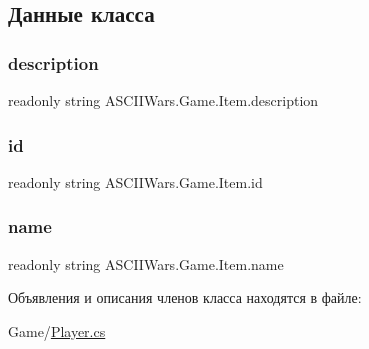\subsection{Данные класса}
\hypertarget{class_a_s_c_i_i_wars_1_1_game_1_1_item_a6ff41e953ccebc64a8df8f8c434535a0}{}\label{class_a_s_c_i_i_wars_1_1_game_1_1_item_a6ff41e953ccebc64a8df8f8c434535a0} 
\subsubsection{\texorpdfstring{description}{description}}
{\footnotesize\ttfamily readonly string A\+S\+C\+I\+I\+Wars.\+Game.\+Item.\+description}

\hypertarget{class_a_s_c_i_i_wars_1_1_game_1_1_item_a744d51f7684a4e46a1f834f8666db58e}{}\label{class_a_s_c_i_i_wars_1_1_game_1_1_item_a744d51f7684a4e46a1f834f8666db58e} 
\subsubsection{\texorpdfstring{id}{id}}
{\footnotesize\ttfamily readonly string A\+S\+C\+I\+I\+Wars.\+Game.\+Item.\+id}

\hypertarget{class_a_s_c_i_i_wars_1_1_game_1_1_item_a994b9ec5f10c123e4345da159c090091}{}\label{class_a_s_c_i_i_wars_1_1_game_1_1_item_a994b9ec5f10c123e4345da159c090091} 
\subsubsection{\texorpdfstring{name}{name}}
{\footnotesize\ttfamily readonly string A\+S\+C\+I\+I\+Wars.\+Game.\+Item.\+name}



Объявления и описания членов класса находятся в файле\+:\begin{DoxyCompactItemize}
\item 
Game/\hyperlink{_player_8cs}{Player.\+cs}\end{DoxyCompactItemize}
